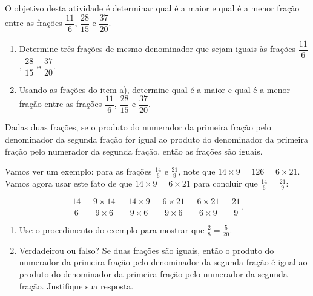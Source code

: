 \begin{atividade}{}\label{chap4-ativ18}

O objetivo desta atividade é determinar qual é a maior e qual é a menor fração entre
as frações $\dfrac{11}{6}$, $\dfrac{28}{15}$ e $\dfrac{37}{20}$.

\begin{enumerate}  %
  \item     Determine três frações de mesmo denominador que sejam iguais às frações     $\dfrac{11}{6}$,     $\dfrac{28}{15}$ e     $\dfrac{37}{20}$.
  \item     Usando as frações do item a), determine qual é a maior e qual é a menor fração entre as frações     $\dfrac{11}{6}$,     $\dfrac{28}{15}$ e     $\dfrac{37}{20}$.
\end{enumerate} %
\end{atividade}

\begin{atividade}{}\label{chap4-ativ19}

Dadas duas frações, se o produto do numerador da primeira fração pelo denominador da segunda fração for igual ao produto do denominador da primeira fração pelo numerador da segunda fração, então as frações são iguais.

Vamos ver um exemplo: para as frações $\frac{14}{6}$ e $\frac{21}{9}$, note que  $14 \times 9 = 126 = 6 \times 21$. Vamos agora usar este fato de que $14 \times 9 = 6 \times 21$
para concluir que $\frac{14}{6} = \frac{21}{9}$:

$$\frac{14}{6} = \frac{9 \times 14}{9 \times 6} = \frac{14 \times 9}{9 \times 6} = \frac{6 \times 21}{9 \times 6} = \frac{6 \times 21}{6 \times 9} = \frac{21}{9}.$$

\begin{enumerate}
 \item Use o procedimento do exemplo para mostrar que $\frac{2}{8} = \frac{5}{20}$.
 \item Verdadeirou ou falso? Se duas frações são iguais, então o produto do numerador da primeira fração pelo denominador da segunda fração é igual ao produto do denominador da primeira fração pelo numerador da segunda fração. Justifique sua resposta.
\end{enumerate}
\end{atividade}

\clearpage

